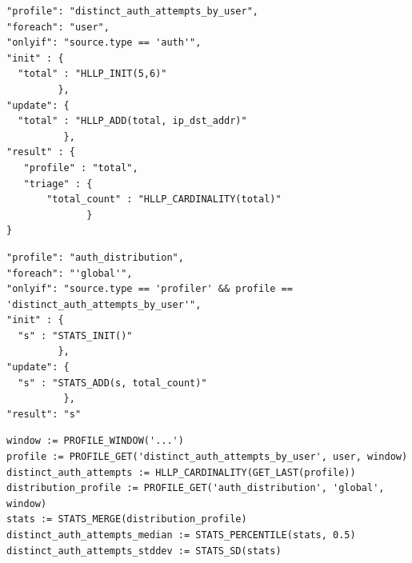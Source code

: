 \documentclass[aspectratio=169]{beamer}
\begin{document}
\begin{frame}[fragile]
\begin{verbatim}
"profile": "distinct_auth_attempts_by_user",
"foreach": "user",
"onlyif": "source.type == 'auth'",
"init" : {
  "total" : "HLLP_INIT(5,6)"
         },
"update": {
  "total" : "HLLP_ADD(total, ip_dst_addr)"
          },
"result" : {
   "profile" : "total",
   "triage" : {
       "total_count" : "HLLP_CARDINALITY(total)"
              }
}
\end{verbatim}
\end{frame}

\begin{frame}[fragile]
\begin{verbatim}
"profile": "auth_distribution",
"foreach": "'global'",
"onlyif": "source.type == 'profiler' && profile == 'distinct_auth_attempts_by_user'",
"init" : {
  "s" : "STATS_INIT()"
         },
"update": {
  "s" : "STATS_ADD(s, total_count)"
          },
"result": "s"
\end{verbatim}
\end{frame}

\begin{frame}[fragile]
\begin{verbatim}
window := PROFILE_WINDOW('...')
profile := PROFILE_GET('distinct_auth_attempts_by_user', user, window)
distinct_auth_attempts := HLLP_CARDINALITY(GET_LAST(profile))
distribution_profile := PROFILE_GET('auth_distribution', 'global', window)
stats := STATS_MERGE(distribution_profile)
distinct_auth_attempts_median := STATS_PERCENTILE(stats, 0.5)
distinct_auth_attempts_stddev := STATS_SD(stats)
\end{verbatim}
\end{frame}

\end{document}
